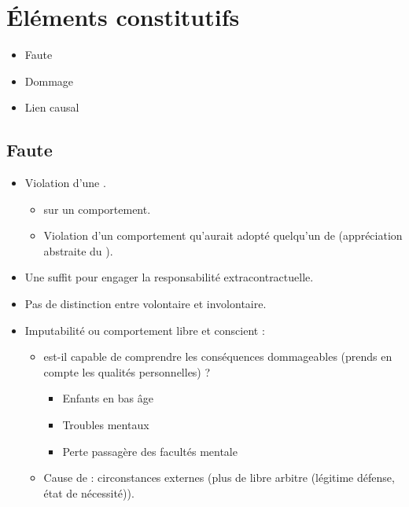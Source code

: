 \section{Éléments constitutifs}
\begin{itemize}
	\item Faute
	\item Dommage
	\item Lien causal
\end{itemize}

\subsection{Faute}
\begin{itemize}
	\item Violation d'une .
	\begin{itemize}
		\item {} sur un comportement.
		\item Violation d'un comportement qu'aurait adopté quelqu'un de  (appréciation abstraite du ).
	\end{itemize}
	\item Une  suffit pour engager la responsabilité extracontractuelle.
	\item Pas de distinction entre volontaire et involontaire.
	\item Imputabilité ou comportement libre et conscient :
	\begin{itemize}
		\item {} est-il capable de comprendre les conséquences dommageables (prends en compte les qualités personnelles) ?
		\begin{itemize}
			\item Enfants en bas âge
			\item Troubles mentaux
			\item Perte passagère des facultés mentale
		\end{itemize}
		\item Cause de  : circonstances externes (plus de libre arbitre (légitime défense, état de nécessité)).
	\end{itemize}
\end{itemize}

